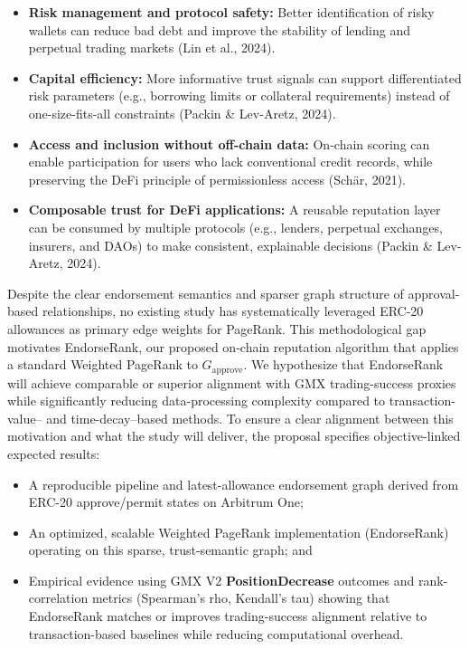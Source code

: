 \begin{itemize}
\item[\textbullet] \textbf{Risk management and protocol safety: }Better identification of risky wallets can reduce bad debt and improve the stability of lending and perpetual trading markets (Lin et al., 2024).
\item[\textbullet] \textbf{Capital efficiency: }More informative trust signals can support differentiated risk parameters (e.g., borrowing limits or collateral requirements) instead of one-size-fits-all constraints (Packin \& Lev-Aretz, 2024).
\item[\textbullet] \textbf{Access and inclusion without off-chain data: }On-chain scoring can enable participation for users who lack conventional credit records, while preserving the DeFi principle of permissionless access (Sch\"{a}r, 2021).
\item[\textbullet] \textbf{Composable trust for DeFi applications: }A reusable reputation layer can be consumed by multiple protocols (e.g., lenders, perpetual exchanges, insurers, and DAOs) to make consistent, explainable decisions (Packin \& Lev-Aretz, 2024).
\end{itemize}
Despite the clear endorsement semantics and sparser graph structure of approval-based relationships, no existing study has systematically leveraged ERC-20 allowances as primary edge weights for PageRank. This methodological gap motivates EndorseRank, our proposed on-chain reputation algorithm that applies a standard Weighted PageRank to $G_{\text{approve}}$. We hypothesize that EndorseRank will achieve comparable or superior alignment with GMX trading-success proxies while significantly reducing data-processing complexity compared to transaction-value-- and time-decay--based methods. To ensure a clear alignment between this motivation and what the study will deliver, the proposal specifies objective-linked expected results:


\begin{itemize}
\item[\textbullet] A reproducible pipeline and latest-allowance endorsement graph derived from ERC-20 approve/permit states on Arbitrum One;
\item[\textbullet] An optimized, scalable Weighted PageRank implementation (EndorseRank) operating on this sparse, trust-semantic graph; and
\item[\textbullet] Empirical evidence using GMX V2 \textbf{PositionDecrease} outcomes and rank-correlation metrics (Spearman's rho, Kendall's tau) showing that EndorseRank matches or improves trading-success alignment relative to transaction-based baselines while reducing computational overhead.
\end{itemize}
